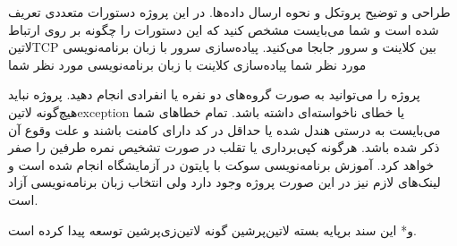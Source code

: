 \documentclass[]{article}
\begin{document}

   طراحی و توضیح پروتکل و نحوه ارسال داده‌ها. در این پروژه دستورات متعددی تعریف شده است و شما می‌بایست مشخص کنید که این دستورات را چگونه بر روی ارتباط ‌لاتین{TCP} بین کلاینت و سرور جابجا می‌کنید.
   پیاده‌سازی سرور با زبان برنامه‌نویسی مورد نظر شما
   پیاده‌سازی کلاینت با زبان برنامه‌نویسی مورد نظر شما


   پروژه را می‌توانید به صورت گروه‌های دو نفره یا انفرادی انجام دهید.
   پروژه نباید هیچ‌گونه ‌لاتین{exception} یا خطای ناخواسته‌ای داشته باشد. تمام خطاهای شما می‌بایست به درستی هندل شده یا حداقل در کد دارای کامنت باشند و علت وقوع آن ذکر شده باشد.
   هرگونه کپی‌برداری یا تقلب در صورت تشخیص نمره طرفین را صفر خواهد کرد.
   آموزش برنامه‌نویسی سوکت با پایتون در آزمایشگاه انجام شده است و لینک‌های لازم نیز در این صورت پروژه وجود دارد ولی انتخاب زبان برنامه‌نویسی آزاد است.

  ‌و*{}
این سند برپایه بسته ‌لاتین{‌پرشین} گونه ‌لاتین{‌زی‌پرشین} توسعه پیدا کرده است.
\end{document}
